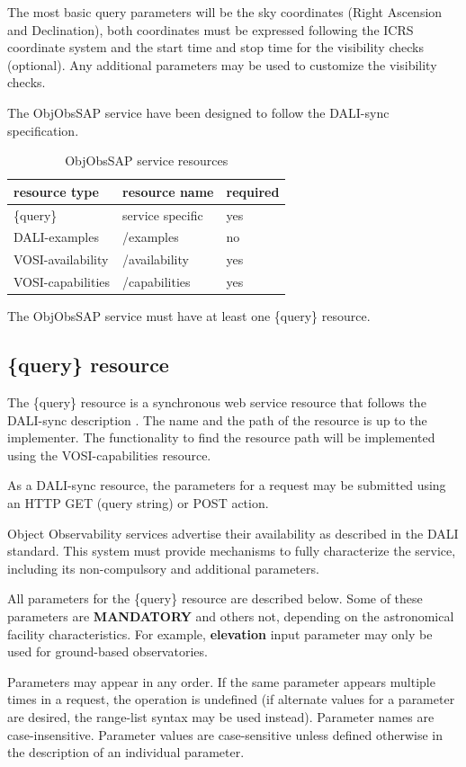 \documentclass[11pt,a4paper]{ivoatex/ivoa}
\begin{document}
The most basic query parameters will be the sky coordinates (Right
Ascension and Declination), both coordinates must be expressed following
the ICRS coordinate system and the start time and stop time for the
visibility checks (optional). Any additional parameters may be used to
customize the visibility checks.

The ObjObsSAP service have been designed to follow the DALI-sync
specification.

\begin{table}[h]
\centering
\begin{tabular}{|l|l|l|}
\hline
\textbf{resource type} & \textbf{resource name} & \textbf{required
} \\
\hline
\{query\} & service specific & yes \\
\hline
DALI-examples & /examples & no \\
\hline
VOSI-availability & /availability & yes \\
\hline
VOSI-capabilities & /capabilities & yes \\
\hline
\end{tabular}
\caption{ObjObsSAP service resources}
\end{table}
The ObjObsSAP service must have at least one \{query\} resource.

\subsection{\{query\} resource} \label{sec:query}
The \{query\} resource is a synchronous web service resource that
follows the DALI-sync description . The name and the path of the
resource is up to the implementer. The functionality to find the
resource path will be implemented using the VOSI-capabilities
resource.

As a DALI-sync resource, the parameters for a request may be submitted
using an HTTP GET (query string) or POST action.

Object Observability services advertise their availability as described in
the DALI standard. This system must provide mechanisms to fully
characterize the service, including its non-compulsory and additional
parameters.

All parameters for the \{query\} resource are described below. Some of
these parameters are \textbf{MANDATORY }and others not, depending on
the astronomical facility characteristics. For example, \textbf{
elevation} input parameter may only be used for ground-based
observatories.

Parameters may appear in any order. If the same parameter appears
multiple times in a request, the operation is undefined (if alternate
values for a parameter are desired, the range-list syntax may be used
instead). Parameter names are case-insensitive. Parameter values are
case-sensitive unless defined otherwise in the description of an
individual parameter.
\end{document}
